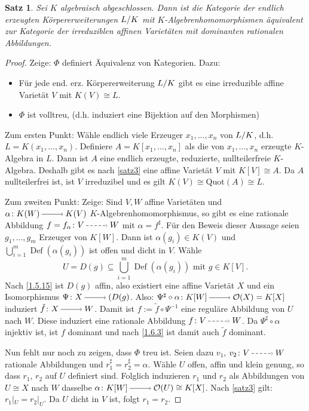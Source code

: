 \documentclass[a4paper,12pt]{scrbook}
\newtheorem{proof}{Beweis}
\newtheorem{satz}{Satz}
\def\O{\mathcal{O}}
\newcommand{\Def}{\operatorname{Def}}
\newcommand{\Quot}{\mathrm{Quot}}
\newcommand{\restrict}[1]{|_{#1}}
\renewcommand{\dotsc}{\ensuremath{\!...}}
\newcommand{\ra}{\raisebox{-1pt}{\tikz{\draw[thin,shorten >=3pt, ->] (0,0) node{\hspace*{-2pt}} -- node{} (1,0);}}\penalty1000\relax}
\newcommand{\ppf}{\raisebox{-1pt}{\tikz{\draw[densely dashed,thin,shorten >=3pt, ->] (0,0) node{\hspace*{-2pt}} -- node{} (1,0);}}\penalty1000\relax}
\newcommand{\Quotient}[2]{
  \mathchoice
  { %
    \raisebox{0.7ex}{\ensuremath{#1}}
    \ensuremath{\mkern-3mu}\big/\ensuremath{\mkern-3mu}
    \raisebox{-0.6ex}{\ensuremath{#2}}
  }
  { %
    #1/#2
  }
  { %
    #1/#2
  }
  { %
    #1/#2
  }
}
\begin{document}
\begin{satz}\label{satz4} Sei $K$ algebraisch abgeschlossen. Dann ist die Kategorie der endlich erzeugten Körpererweiterungen $\Quotient{L}{K}$ mit $K$-Algebrenhomomorphismen äquivalent zur Kategorie der irreduziblen affinen Varietäten mit dominanten rationalen Abbildungen.
\end{satz}

\begin{proof} Zeige: $\Phi$ definiert Äquivalenz von Kategorien. Dazu:
  \begin{itemize}
  \item Für jede end. erz. Körpererweiterung $\Quotient{L}{K}$ gibt es eine irreduzible affine Varietät $V$ mit $K(V)\cong L$.
  \item $\Phi$ ist volltreu, (d.h. induziert eine Bijektion auf den Morphismen)
  \end{itemize}
Zum ersten Punkt: Wähle endlich viele Erzeuger $x_1,\dotsc,x_n$ von $\Quotient{L}{K}$, d.h. $L=K(x_1,\dotsc,x_n)$. Definiere $A=K[x_1,\dotsc,x_n]$ als die von $x_1,\dotsc,x_n$ erzeugte $K$-Algebra in $L$. Dann ist $A$ eine endlich erzeugte, reduzierte, nullteilerfreie
$K$-Algebra. Deshalb gibt es nach \cref{satz3} eine affine Varietät $V$ mit $K[V]\cong A$. Da $A$ nullteilerfrei ist, ist $V$ irreduzibel und es gilt $K(V)\cong \Quot(A)\cong L$.

Zum zweiten Punkt: Zeige: Sind $V,W$ affine Varietäten und $\alpha \colon K(W)\ra K(V)$ $K$-Algebrenhomomorphismus, so gibt es eine rationale Abbildung $f=f_{\alpha}\colon V\ppf W$ mit $\alpha=f^{\sharp}$.
Für den Beweis dieser Aussage seien $g_1,\dotsc,g_m$ Erzeuger von $K[W]$. Dann ist $\alpha(g_i)\in K(V)$ und $\bigcup_{i=1}^{m} \Def(\alpha(g_i))$ ist offen und dicht in $V$. Wähle \[U=D(g)\subseteq \bigcup_{i=1}^{m} \Def(\alpha(g_i))\text{ mit }g \in K[V].\]
Nach \cref{1.5.15} ist  $D(g)$ affin, also existiert eine affine Varietät $X$ und ein Isomorphismus $\Psi \colon X\ra (D(g)$.
Also: $\Psi^{\sharp}\circ \alpha \colon K[W] \ra \O(X)=K[X]$ induziert $\tilde{f} \colon X\ra W$.
Damit ist $f:=\tilde{f}\circ \Psi^{-1}$ eine reguläre Abbildung von $U$ nach $W$. Diese induziert eine rationale Abbildung $f \colon V\ppf W$. Da $\Psi^{\sharp}\circ \alpha$ injektiv ist, ist $f$ dominant und nach \cref{1.6.3} ist damit auch $\tilde{f}$ dominant.

Nun fehlt nur noch zu zeigen, dass $\Phi$ treu ist. Seien dazu $v_1$, $v_2 \colon V\ppf W$ rationale Abbildungen und $r_1^{\sharp}=r_2^{\sharp}=\alpha$. Wähle $U$ offen, affin und klein genung, so dass $r_1$, $r_2$ auf $U$ definiert sind.
Folglich induzieren $r_1$ und $r_2$ als Abbildungen von $U\cong X$ nach $W$ dasselbe $\alpha \colon K[W] \ra \O(U)\cong K[X]$. Nach \cref{satz3} gilt: $r_1\restrict{U}=r_2\restrict{U}$. Da $U$ dicht in $V$ ist, folgt $r_1=r_2$.
\end{proof}
\end{document}

